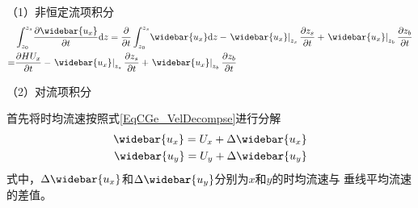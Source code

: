 （1）非恒定流项积分
\begin{equation}
    \begin{aligned}
    &
    \int_{z_0}^{ z_{s}}\!
    \frac{\partial \widebar{u_{x}}}{\partial t} 
    \mathrm{d}z
    =
    \frac{\partial}{\partial t}
    \int_{z_0}^{ z_{s}}\!
    \widebar{u_{x}}
    \mathrm{d}z
    -
    \left.\widebar{u_{x}}\right|_{z_{s}}\frac{\partial  z_{s}}{\partial t}
    +
    \left.\widebar{u_{x}}\right|_{z_{b}}\frac{\partial z_{b}}{\partial t}
        \\
        =&
    \frac{\partial HU_{x}}{\partial t}
    -
    \left.\widebar{u_{x}}\right|_{z_{s}}\frac{\partial  z_{s}}{\partial t}
    +
    \left.\widebar{u_{x}}\right|_{z_{b}}\frac{\partial z_{b}}{\partial t}
    \end{aligned}
        \label{EqCGe_Mex_US_Int}
\end{equation}

（2）对流项积分

首先将时均流速按照式\eqref{EqCGe_VelDecompse}进行分解
\begin{equation}
\begin{aligned}
\widebar{u_{x}}
=
U_{x}+\Delta\widebar{u_{x}}
\\
\widebar{u_{y}}
=
U_{y}+\Delta\widebar{u_{y}}
\end{aligned}
\label{EqCGe_VelDecompse}
\end{equation}
式中，$\Delta\widebar{u_{x}}$和$\Delta\widebar{u_{y}}$分别为$x$和$y$的时均流速与
垂线平均流速的差值。

